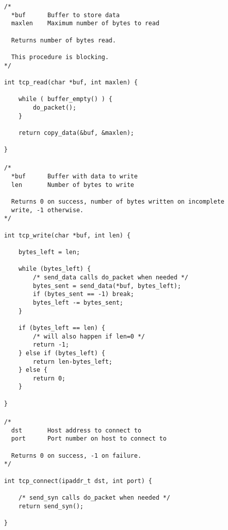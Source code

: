 \documentclass[11pt]{article}
\begin{document}
\begin{lstlisting}[title=Procedure tcp\_read]
/*
  *buf      Buffer to store data
  maxlen    Maximum number of bytes to read

  Returns number of bytes read.

  This procedure is blocking.
*/

int tcp_read(char *buf, int maxlen) {

    while ( buffer_empty() ) {
        do_packet();
    }

    return copy_data(&buf, &maxlen);

}
\end{lstlisting}


\paragraph{}


\begin{lstlisting}[title=Procedure tcp\_write]
/*
  *buf      Buffer with data to write
  len       Number of bytes to write

  Returns 0 on success, number of bytes written on incomplete
  write, -1 otherwise.
*/

int tcp_write(char *buf, int len) {

    bytes_left = len;

    while (bytes_left) {
        /* send_data calls do_packet when needed */
        bytes_sent = send_data(*buf, bytes_left);
        if (bytes_sent == -1) break;
        bytes_left -= bytes_sent;
    }

    if (bytes_left == len) {
        /* will also happen if len=0 */
        return -1;
    } else if (bytes_left) {
        return len-bytes_left;
    } else {
        return 0;
    }

}
\end{lstlisting}


\paragraph{}


\begin{lstlisting}[title=Procedure tcp\_connect]
/*
  dst       Host address to connect to
  port      Port number on host to connect to

  Returns 0 on success, -1 on failure.
*/

int tcp_connect(ipaddr_t dst, int port) {

    /* send_syn calls do_packet when needed */
    return send_syn();

}
\end{lstlisting}
\end{document}
